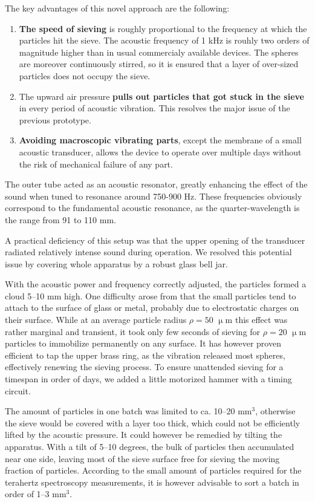 The key advantages of this novel approach are the following:
\begin{enumerate}
 \item{\textbf{The speed of sieving} is roughly proportional to the frequency at which the particles hit the sieve. The acoustic frequency of 1 kHz is rouhly two orders of magnitude higher than in usual commercialy available devices. The spheres are moreover continuously stirred, so it is ensured that a layer of over-sized particles does not occupy the sieve.} 
 \item{The upward air pressure \textbf{pulls out particles that got stuck in the sieve} in every period of acoustic vibration. This resolves the major issue of the previous prototype.} 
 \item{\textbf{Avoiding macroscopic vibrating parts}, except the membrane of a small acoustic transducer, allows the device to operate over multiple days without the risk of mechanical failure of any part.}
 \end{enumerate}


The outer tube acted as an acoustic resonator, greatly enhancing the effect of the sound when tuned to resonance around 750-900 Hz. These frequencies obviously correspond to the fundamental acoustic resonance, as the quarter-wavelength is the range from 91 to 110 mm. 

A practical deficiency of this setup was that the upper opening of the transducer radiated relatively intense sound during operation. We resolved this potential issue by covering whole apparatus by a robust glass bell jar.

With the acoustic power and frequency correctly adjusted, the particles formed a cloud 5--10 mm high. One difficulty arose from that the small particles tend to attach to the surface of glass or metal, probably due to electrostatic charges on their surface. While at an average particle radius $\rho = 50$ $\upmu$m this effect was rather marginal and transient, it took only few seconds of sieving for $\rho = 20$ $\upmu$m particles to immobilize permanently on any surface. It has however proven efficient to tap the upper brass ring, as the vibration released most spheres, effectively renewing the sieving process. To ensure unattended sieving for a timespan in order of days, we added a little motorized hammer with a timing circuit. %

The amount of particles in one batch was limited to ca. 10--20 mm$^{3}$, otherwise the sieve would be covered with a layer too thick, which could not be efficiently lifted by the acoustic pressure.
It could however be remedied by tilting the apparatus. With a tilt of 5--10 degrees, the bulk of particles then accumulated near one side, leaving most of the sieve surface free for sieving the moving fraction of particles. According to the small amount of particles required for the terahertz spectroscopy measurements, it is however advisable to sort a batch in order of 1--3 mm$^{3}$.


